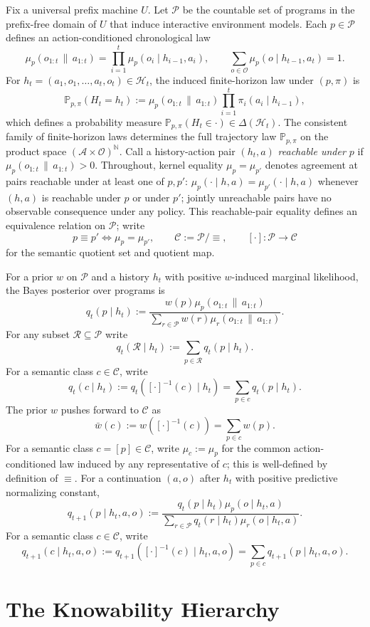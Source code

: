 \documentclass[11pt]{article}
\theoremstyle{definition}
\theoremstyle{remark}
\newcommand{\Acal}{\mathcal{A}}
\newcommand{\Ccal}{\mathcal{C}}
\newcommand{\Ocal}{\mathcal{O}}
\newcommand{\Pcal}{\mathcal{P}}
\newcommand{\Hcal}{\mathcal{H}}
\newcommand{\Rcal}{\mathcal{R}}
\newcommand{\Prob}{\mathbb{P}}
\newcommand{\givena}{\,\|\,}
\begin{document}
Fix a universal prefix machine $U$. Let $\Pcal$ be the countable set of programs in the prefix-free domain of $U$ that induce interactive environment models. Each $p\in\Pcal$ defines an action-conditioned chronological law
\[
\mu_p(o_{1:t}\givena a_{1:t})
=
\prod_{i=1}^{t}\mu_p(o_i\mid h_{i-1},a_i),
\qquad
\sum_{o\in\Ocal}\mu_p(o\mid h_{t-1},a_t)=1.
\]
For $h_t=(a_1,o_1,\dots,a_t,o_t)\in\Hcal_t$, the induced finite-horizon law under $(p,\pi)$ is
\[
\Prob_{p,\pi}(H_t=h_t)
:=
\mu_p(o_{1:t}\givena a_{1:t})\prod_{i=1}^t \pi_i(a_i\mid h_{i-1}),
\]
which defines a probability measure $\Prob_{p,\pi}(H_t\in\cdot)\in\Delta(\Hcal_t)$. The consistent family of finite-horizon laws determines the full trajectory law $\Prob_{p,\pi}$ on the product space $(\Acal\times\Ocal)^{\mathbb N}$. Call a history-action pair $(h_t,a)$ \emph{reachable under $p$} if $\mu_p(o_{1:t}\givena a_{1:t})>0$. Throughout, kernel equality $\mu_p=\mu_{p'}$ denotes agreement at pairs reachable under at least one of $p,p'$: $\mu_p(\cdot\mid h,a)=\mu_{p'}(\cdot\mid h,a)$ whenever $(h,a)$ is reachable under $p$ or under $p'$; jointly unreachable pairs have no observable consequence under any policy. This reachable-pair equality defines an equivalence relation on $\Pcal$; write
\[
p\equiv p'
\iff
\mu_p=\mu_{p'},
\qquad
\Ccal:=\Pcal/\!\equiv,
\qquad
[\cdot]:\Pcal\to\Ccal
\]
for the semantic quotient set and quotient map.

For a prior $w$ on $\Pcal$ and a history $h_t$ with positive $w$-induced marginal likelihood, the Bayes posterior over programs is
\[
q_t(p\mid h_t)
:=
\frac{w(p)\mu_p(o_{1:t}\givena a_{1:t})}
{\sum_{r\in\Pcal} w(r)\mu_r(o_{1:t}\givena a_{1:t})}.
\]
For any subset $\Rcal\subseteq\Pcal$ write
\[
q_t(\Rcal\mid h_t):=\sum_{p\in\Rcal} q_t(p\mid h_t).
\]
For a semantic class $c\in\Ccal$, write
\[
q_t(c\mid h_t):=q_t([\cdot]^{-1}(c)\mid h_t)=\sum_{p\in c} q_t(p\mid h_t).
\]
The prior $w$ pushes forward to $\Ccal$ as
\[
\bar w(c):=w([\cdot]^{-1}(c))=\sum_{p\in c}w(p).
\]
For a semantic class $c=[p]\in\Ccal$, write $\mu_c:=\mu_p$ for the common action-conditioned law induced by any representative of $c$; this is well-defined by definition of $\equiv$.
For a continuation $(a,o)$ after $h_t$ with positive predictive normalizing constant,
\[
q_{t+1}(p\mid h_t,a,o)
:=
\frac{q_t(p\mid h_t)\mu_p(o\mid h_t,a)}
{\sum_{r\in\Pcal} q_t(r\mid h_t)\mu_r(o\mid h_t,a)}.
\]
For a semantic class $c\in\Ccal$, write
\[
q_{t+1}(c\mid h_t,a,o):=q_{t+1}([\cdot]^{-1}(c)\mid h_t,a,o)=\sum_{p\in c} q_{t+1}(p\mid h_t,a,o).
\]

\section{The Knowability Hierarchy}
\label{sec:hierarchy}
\end{document}
